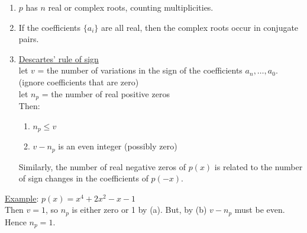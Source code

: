 \begin{enumerate}
    \item $p$ has $n$ real or complex roots, counting multiplicities. \\
    \item If the coefficients $\{ a_i \}$ are all real, then the complex roots occur in conjugate pairs.
    \item \underline{Descartes' rule of sign} \\
        let $v$ = the number of variations in the sign of the coefficients $a_n, \dots, a_0$. (ignore coefficients that are zero)\\
        let $n_p$ =  the number of real positive zeros \\
        Then:
            \begin{enumerate}
                \item $n_p \leq v$
                \item $v-n_p$ is an even integer (possibly zero)
            \end{enumerate}
        Similarly, the number of real negative zeros of $p(x)$ is related to the number of sign changes in the coefficients of $p(-x)$.
\end{enumerate}

\noindent \underline{Example}: $p(x) = x^4 + 2x^2 - x - 1$ \\

Then $v=1$, so $n_p$ is either zero or 1 by (a). But, by (b) $v-n_p$ must be even. Hence $n_p=1$. 

